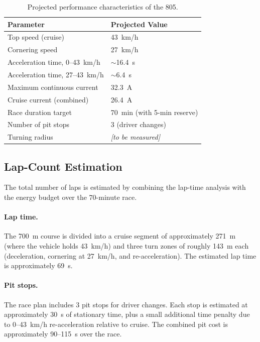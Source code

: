 \documentclass[12pt]{article}
\begin{document}
\begin{table}[htbp]
  \centering
  \caption{Projected performance characteristics of the 805.}
  \label{tab:results}
  \begin{tabular}{ll}
    \toprule
    \textbf{Parameter} & \textbf{Projected Value} \\
    \midrule
    Top speed (cruise)                  & 43~km/h \\
    Cornering speed                     & 27~km/h \\
    Acceleration time, 0--43~km/h       & $\sim$16.4~s \\
    Acceleration time, 27--43~km/h      & $\sim$6.4~s \\
    Maximum continuous current          & 32.3~A \\
    Cruise current (combined)           & 26.4~A \\
    Race duration target                & 70~min (with 5-min reserve) \\
    Number of pit stops                 & 3 (driver changes) \\
    Turning radius                      & \textit{[to be measured]} \\
    \bottomrule
  \end{tabular}
\end{table}

\subsection{Lap-Count Estimation}

The total number of laps is estimated by combining the lap-time analysis
with the energy budget over the 70-minute race.

\paragraph{Lap time.} The 700~m course is divided into a cruise segment of
approximately 271~m (where the vehicle holds 43~km/h) and three turn zones
of roughly 143~m each (deceleration, cornering at 27~km/h, and
re-acceleration). The estimated lap time is approximately 69~s.

\paragraph{Pit stops.} The race plan includes 3 pit stops for driver
changes. Each stop is estimated at approximately 30~s of stationary time,
plus a small additional time penalty due to 0--43~km/h re-acceleration
relative to cruise. The combined pit cost is approximately 90--115~s over
the race.
\end{document}

